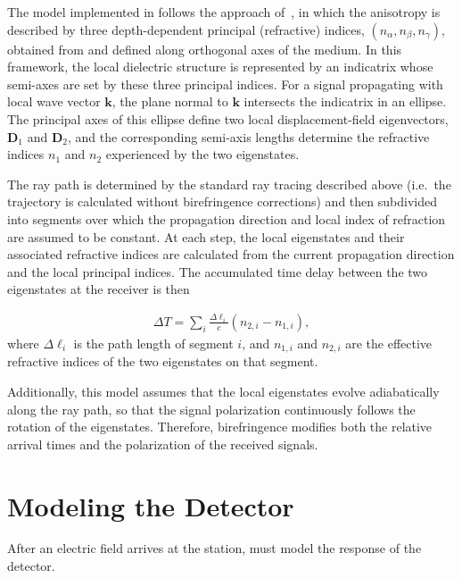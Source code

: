             The model implemented in \arasim{} follows the approach of~\citep{birefringence}, in which the anisotropy is described by three depth-dependent principal (refractive) indices, $(n_\alpha, n_\beta, n_\gamma)$, obtained from \citep{ice_spicedata} and defined along orthogonal axes of the medium.
            In this framework, the local dielectric structure is represented by an indicatrix whose semi-axes are set by these three principal indices.
            For a signal propagating with local wave vector $\mathbf{k}$, the plane normal to $\mathbf{k}$ intersects the indicatrix in an ellipse.
            The principal axes of this ellipse define two local displacement-field eigenvectors, $\mathbf{D}_1$ and $\mathbf{D}_2$, and the corresponding semi-axis lengths determine the refractive indices $n_1$ and $n_2$ experienced by the two eigenstates.

            The ray path is determined by the standard ray tracing described above (i.e.\ the trajectory is calculated without birefringence corrections) and then subdivided into segments over which the propagation direction and local index of refraction are assumed to be constant.
            At each step, the local eigenstates and their associated refractive indices are calculated from the current propagation direction and the local principal indices.
            The accumulated time delay between the two eigenstates at the receiver is then

            \begin{align}
                \Delta T = \sum_i \frac{\Delta \ell_i}{c}\left(n_{2,i}-n_{1,i}\right),
            \end{align}
            where $\Delta \ell_i$ is the path length of segment $i$, and $n_{1,i}$ and $n_{2,i}$ are the effective refractive indices of the two eigenstates on that segment.

            Additionally, this model assumes that the local eigenstates evolve adiabatically along the ray path, so that the signal polarization continuously follows the rotation of the eigenstates.
            Therefore, birefringence modifies both the relative arrival times and the polarization of the received signals.
            
    \section{Modeling the Detector}\label{app:detector_modeling}
    
        After an electric field arrives at the station,
        \arasim{} must model the response of the detector.
    
